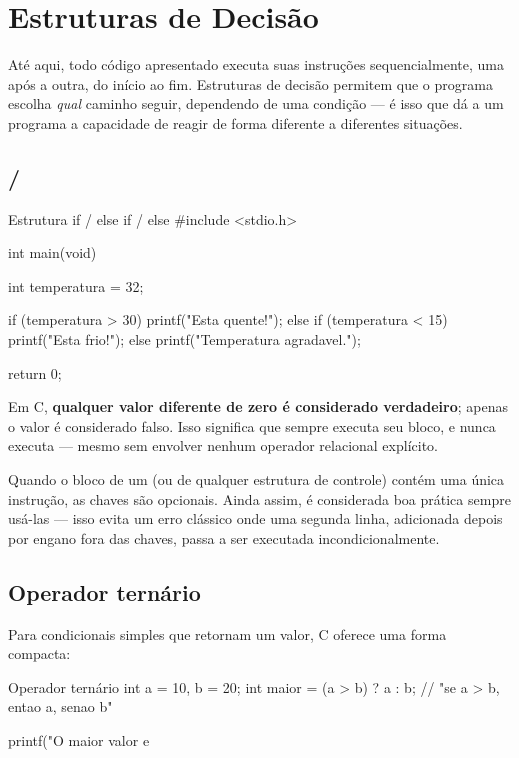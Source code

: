\chapter{Estruturas de Decisão}
\label{cap:decisao}

Até aqui, todo código apresentado executa suas instruções sequencialmente, uma após a outra, do início ao fim. Estruturas de decisão permitem que o programa escolha \emph{qual} caminho seguir, dependendo de uma condição — é isso que dá a um programa a capacidade de reagir de forma diferente a diferentes situações.

\section{ / }

\begin{codigoc}{Estrutura if / else if / else}
#include <stdio.h>

int main(void) {
    int temperatura = 32;

    if (temperatura > 30) {
        printf("Esta quente!\n");
    } else if (temperatura < 15) {
        printf("Esta frio!\n");
    } else {
        printf("Temperatura agradavel.\n");
    }

    return 0;
}
\end{codigoc}

Em C, \textbf{qualquer valor diferente de zero é considerado verdadeiro}; apenas o valor  é considerado falso. Isso significa que  sempre executa seu bloco, e  nunca executa — mesmo sem envolver nenhum operador relacional explícito.

\begin{dica}
Quando o bloco de um  (ou de qualquer estrutura de controle) contém uma única instrução, as chaves são opcionais. Ainda assim, é considerada boa prática sempre usá-las — isso evita um erro clássico onde uma segunda linha, adicionada depois por engano fora das chaves, passa a ser executada incondicionalmente.
\end{dica}

\section{Operador ternário}

Para condicionais simples que retornam um valor, C oferece uma forma compacta:

\begin{codigoc}{Operador ternário}
int a = 10, b = 20;
int maior = (a > b) ? a : b;   // "se a > b, entao a, senao b"

printf("O maior valor e %
\end{codigoc}

